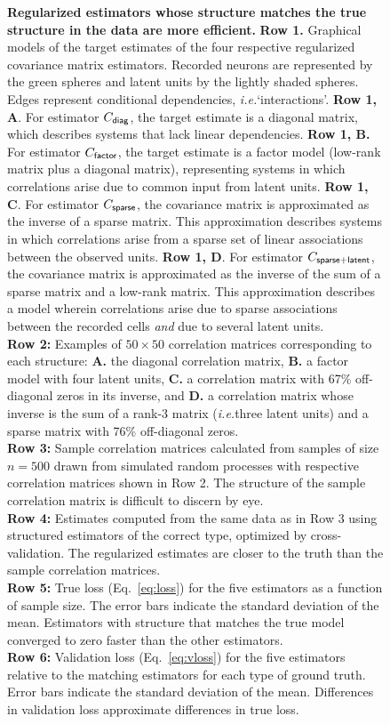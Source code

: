 \begin{figure}[h!]
\caption{
{\bf Regularized estimators whose structure matches the true structure in the data are more efficient.}
     {\bf Row 1.} Graphical models of the target estimates of the four respective regularized covariance matrix estimators.  Recorded neurons are represented by the green spheres and latent units by the lightly shaded spheres.  Edges represent conditional dependencies, \emph{i.e.}\;`interactions'.
     {\bf Row 1, A}.  For estimator $C_{\sf diag}$, the target estimate is a diagonal matrix, which describes systems that lack linear dependencies.
     {\bf  Row 1, B.} For estimator $C_{\sf factor}$, the target estimate is a factor model (low-rank matrix plus a diagonal matrix), representing systems in which correlations arise due to common input from latent units.
     {\bf  Row 1, C}. For estimator $C_{\sf sparse}$, the covariance matrix is approximated as the inverse of a sparse matrix. This approximation describes systems in which correlations arise from a sparse set of  linear associations between the observed units.
     {\bf  Row 1, D}.  For estimator $C_{\sf sparse+latent}$, the covariance matrix is approximated as the inverse of the sum of a sparse matrix and a low-rank matrix. This approximation describes a model wherein correlations arise due to sparse associations between the recorded cells \emph{and} due to several latent units.
     \\
     {\bf Row 2:} Examples of $50\times 50$ correlation matrices corresponding to each structure: {\bf A.} the diagonal correlation matrix, {\bf B.} a factor model with four latent units, {\bf C.}  a correlation matrix with 67\%  off-diagonal zeros in its inverse, and {\bf  D.} a correlation matrix whose inverse is the sum of a rank-3 matrix (\emph{i.e.}\;three latent units) and a sparse matrix with 76\% off-diagonal zeros.
     \\
{\bf Row 3:} Sample correlation matrices calculated from samples of size $n=500$ drawn from simulated random processes with respective correlation matrices shown in Row 2.  The structure of the sample correlation matrix is difficult to discern by eye.
     \\
{\bf Row 4:} Estimates computed from the same data as in Row 3 using structured estimators of the correct type, optimized by cross-validation.  The regularized estimates are closer to the truth than the sample correlation matrices.
     \\
{\bf Row 5:} True loss (Eq.~\ref{eq:loss}) for the five estimators as a function of sample size. The error bars indicate the standard deviation of the mean.  Estimators with structure that matches the true model converged to zero faster than the other estimators.
     \\
{\bf Row 6:} Validation loss (Eq.~\ref{eq:vloss}) for the five estimators relative to the matching estimators for each type of ground truth. Error bars indicate the standard deviation of the mean.  Differences in validation loss approximate differences in true loss.
}
\label{fig:1}
\end{figure}

